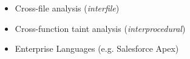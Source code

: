 \documentclass[preview]{standalone}
\begin{document}
\begin{center}
\begin{itemize}
                   \item Cross-file analysis (\textit{interfile})
                   \item Cross-function taint analysis (\textit{interprocedural})
                   \item Enterprise Languages (e.g. Salesforce Apex)
                  \end{itemize}
\end{center}
\end{document}
